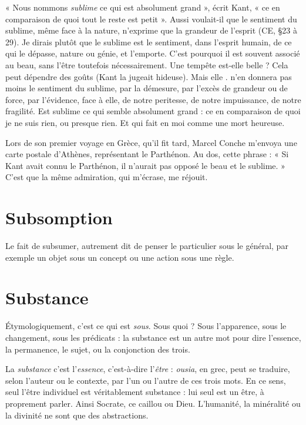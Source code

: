 « Nous nommons {\it sublime} ce qui est absolument grand », écrit Kant, « ce en
comparaison de quoi tout le reste est petit ». Aussi voulait-il que le sentiment
du sublime, même face à la nature, n’exprime que la grandeur de l'esprit
(CE, \S 23 à 29). Je dirais plutôt que le sublime est le sentiment, dans l'esprit
humain, de ce qui le dépasse, nature ou génie, et l'emporte. C’est pourquoi il
est souvent associé au beau, sans l’être toutefois nécessairement. Une tempête
est-elle belle ? Cela peut dépendre des goûts (Kant la jugeait hideuse). Mais elle
. n’en donnera pas moins le sentiment du sublime, par la démesure, par l’excès
de grandeur ou de force, par l'évidence, face à elle, de notre peritesse, de notre
impuissance, de notre fragilité. Est sublime ce qui semble absolument grand :
ce en comparaison de quoi je ne suis rien, ou presque rien. Et qui fait en moi
comme une mort heureuse.

Lors de son premier voyage en Grèce, qu’il fit tard, Marcel Conche
m'envoya une carte postale d'Athènes, représentant le Parthénon. Au dos, cette
phrase : « Si Kant avait connu le Parthénon, il n'aurait pas opposé le beau et le
sublime. » C’est que la même admiration, qui m'écrase, me réjouit.

\section{Subsomption}
Le fait de subsumer, autrement dit de penser le particulier
sous le général, par exemple un objet sous un concept ou
une action sous une règle.

\section{Substance}
Étymologiquement, c’est ce qui est {\it sous}. Sous quoi ? Sous l’apparence,
sous le changement, sous les prédicats : la substance
est un autre mot pour dire l'essence, la permanence, le sujet, ou la conjonction
des trois.

La {\it substance} c’est l'{\it essence}, c’est-à-dire l’{\it être} : {\it ousia}, en grec, peut se traduire,
selon l’auteur ou le contexte, par l’un ou l’autre de ces trois mots. En ce sens,
seul l'être individuel est véritablement substance : lui seul est un être, à proprement
parler. Ainsi Socrate, ce caillou ou Dieu. L’humanité, la minéralité ou la
divinité ne sont que des abstractions.

